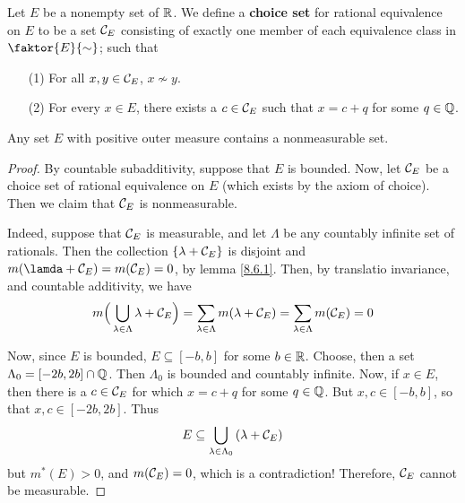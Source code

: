 \begin{definition}
    Let $E$ be a nonempty set of  $\mathbb{R}$. We define a  \textbf{choice set} for
    rational equivalence on $E$ to be a set  $\mathcal{C}_E$ consisting of exactly one
    member of each equivalence class in  $\faktor{E}{\sim}$; such that
    \begin{enumerate}
        \item[(1)] For all $x,y \in \mathcal{C}_E$,  $x \not\sim y$.

        \item[(2)] For every $x \in E$, there exists a $c \in \mathcal{C}_E$ such that
            $x=c+q$ for some  $q \in \mathbb{Q}$.
    \end{enumerate}
\end{definition}

\begin{theorem}\label{8.6.3}
    Any set $E$ with positive outer measure contains a nonmeasurable set.
\end{theorem}
\begin{proof}
    By countable subadditivity, suppose that $E$ is bounded. Now, let  $\mathcal{C}_E$
    be a choice set of rational equivalence on $E$ (which exists by the axiom of
    choice). Then we claim that $\mathcal{C}_E$ is nonmeasurable.

    Indeed, suppose that $\mathcal{C}_E$ is measurable, and let $\Lambda$ be any
    countably infinite set of rationals. Then the collection  $\{\lambda+\mathcal{C}_E\}$ is
    disjoint and $m(\lamda+\Cc_E)=m(\Cc_E)=0$, by lemma \ref{8.6.1}. Then, by
    translatio invariance, and countable additivity, we have
    \begin{equation*}
        m\Big{(} \bigcup_{\lambda \in \Lambda}{\lambda+\mathcal{C}_E} \Big{)}=
        \sum_{\lambda \in \Lambda}{m(\lambda+\mathcal{C}_E)}=\sum_{\lambda \in \Lambda}{m(\mathcal{C}_E)}=0
    \end{equation*}

    Now, since $E$ is bounded,  $E \subseteq [-b,b]$ for some $b \in \mathbb{R}$.
    Choose, then a set  $\Lambda_0=[-2b,2b] \cap \mathbb{Q}$. Then $\Lambda_0$ is
    bounded and countably infinite. Now, if $x \in E$, then there is a  $c \in
    \mathcal{C}_E$ for which  $x=c+q$ for some  $q \in \mathbb{Q}$. But  $x,c \in [-b,b]$, so
    that $x,c \in [-2b,2b]$. Thus
    \begin{equation*}
        E \subseteq \bigcup_{\lambda \in \Lambda_0}{(\lambda+\mathcal{C}_E)}
    \end{equation*}
    but $m^\ast(E)>0$, and $m(\mathcal{C}_E)=0$, which is a contradiction! Therefore,
    $\mathcal{C}_E$ cannot be measurable.
\end{proof}
